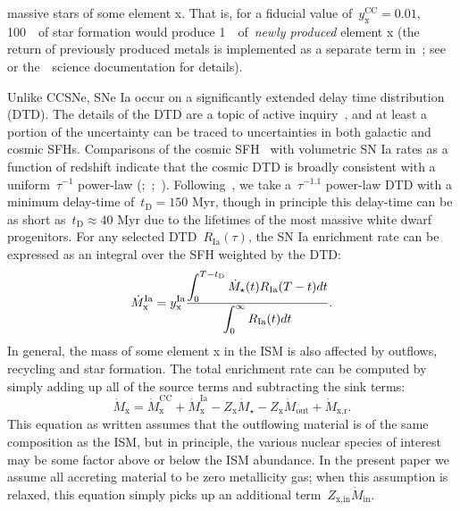 \documentclass[ms.tex]{subfiles}
\begin{document}
massive stars of some element x.
That is, for a fiducial value of~$y_\text{x}^\text{CC} = 0.01$, 100~\msun~of
star formation would produce 1~\msun~of~\textit{newly produced} element x (the
return of previously produced metals is implemented as a separate term
in~\vice; see~\citealt{Johnson2020} or the~\vice~science documentation for
details).
\par
Unlike CCSNe, SNe Ia occur on a significantly extended delay time distribution
(DTD).
The details of the DTD are a topic of active inquiry~\citep[e.g.,][]{Greggio2005,
Strolger2020, Freundlich2021}, and at least a portion of the uncertainty can be
traced to uncertainties in both galactic and cosmic SFHs.
Comparisons of the cosmic SFH~\citep[e.g.,][]{Hopkins2006, Madau2014, Davies2016,
Madau2017, Driver2018} with volumetric SN Ia rates as a function of redshift
indicate that the cosmic DTD is broadly consistent with a uniform~$\tau^{-1}$
power-law (\citealp{Maoz2012a};~\citealp*{Maoz2012b};~\citealp{Graur2013,
Graur2014}).
Following~\citet{Weinberg2017}, we take a~$\tau^{-1.1}$ power-law DTD with a
minimum delay-time of~$t_\text{D} = 150$ Myr, though in principle this
delay-time can be as short as~$t_\text{D} \approx 40$ Myr due to the lifetimes
of the most massive white dwarf progenitors.
For any selected DTD~$R_\text{Ia}(\tau)$, the SN Ia enrichment rate can be
expressed as an integral over the SFH weighted by the DTD:
\begin{equation}
\dot{M}_\text{x}^\text{Ia} = y_\text{x}^\text{Ia}\frac{\displaystyle{
	\int_0^{T - t_\text{D}} \dot{M}_\star(t) R_\text{Ia}(T - t) dt
}}{\displaystyle{
	\int_0^\infty R_\text{Ia}(t) dt
}}.
\end{equation}
In general, the mass of some element x in the ISM is also affected by outflows,
recycling and star formation.
The total enrichment rate can be computed by simply adding up all of the source
terms and subtracting the sink terms:
\begin{equation}
\dot{M}_\text{x} = \dot{M}_\text{x}^\text{CC} + \dot{M}_\text{x}^\text{Ia} -
Z_\text{x}\dot{M}_\star - Z_\text{x}\dot{M}_\text{out} + \dot{M}_{\text{x,r}}.
\label{eq:enrichment}
\end{equation}
This equation as written assumes that the outflowing material is of the same
composition as the ISM, but in principle, the various nuclear species of
interest may be some factor above or below the ISM abundance.
In the present paper we assume all accreting material to be zero metallicity
gas; when this assumption is relaxed, this equation simply picks up an
additional term~$Z_\text{x,in}\dot{M}_\text{in}$.
\end{document}
